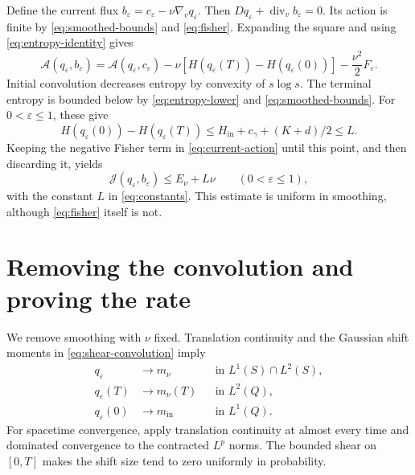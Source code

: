 \documentclass[11pt]{article}
\newcommand{\mi}{m_{\mathrm{in}}}
\newcommand{\A}{\mathcal A}
\newcommand{\J}{\mathcal J}
\newcommand{\D}{D}
\begin{document}
Define the current flux
$b_\varepsilon=c_\varepsilon-\nu\nabla_vq_\varepsilon$.
Then $\D q_\varepsilon+\operatorname{div}_vb_\varepsilon=0$.
Its action is finite by \eqref{eq:smoothed-bounds} and \eqref{eq:fisher}.
Expanding the square and using \eqref{eq:entropy-identity} gives
\begin{equation}\label{eq:current-action}
 \A(q_\varepsilon,b_\varepsilon)
 =\A(q_\varepsilon,c_\varepsilon)
 -\nu[H(q_\varepsilon(T))-H(q_\varepsilon(0))]
 -\frac{\nu^2}{2}F_\varepsilon .
\end{equation}
Initial convolution decreases entropy by convexity of $s\log s$.
The terminal entropy is bounded below by \eqref{eq:entropy-lower}
and \eqref{eq:smoothed-bounds}. For $0<\varepsilon\leq1$, these give
\[
 H(q_\varepsilon(0))-H(q_\varepsilon(T))
 \leq H_{\mathrm{in}}+c_\gamma+(K+d)/2\leq L.
\]
Keeping the negative Fisher term in \eqref{eq:current-action} until
this point, and then discarding it, yields
\begin{equation}\label{eq:excess}
 \J(q_\varepsilon,b_\varepsilon)\leq E_\nu+L\nu
 \qquad(0<\varepsilon\leq1),
\end{equation}
with the constant $L$ in \eqref{eq:constants}.
This estimate is uniform in smoothing, although \eqref{eq:fisher}
itself is not.

\section{Removing the convolution and proving the rate}

We remove smoothing with $\nu$ fixed. Translation continuity and the
Gaussian shift moments in \eqref{eq:shear-convolution} imply
\begin{equation}\label{eq:density-limits}
 \begin{aligned}
 q_\varepsilon&\longrightarrow m_\nu
       &&\text{in }L^1(S)\cap L^2(S),\\
 q_\varepsilon(T)&\longrightarrow m_\nu(T)
       &&\text{in }L^2(Q),\\
 q_\varepsilon(0)&\longrightarrow\mi
       &&\text{in }L^1(Q).
 \end{aligned}
\end{equation}
For spacetime convergence, apply translation continuity at almost every
time and dominated convergence to the contracted $L^p$ norms.
The bounded shear on $[0,T]$ makes the shift size tend to zero uniformly
in probability.
\end{document}
